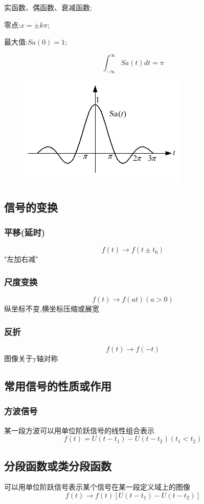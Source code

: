 \documentclass[12pt, a4paper, oneside]{ctexart}
\begin{document}
实函数、偶函数、衰减函数;

零点:$x=\pm k\pi$;

最大值:$Sa(0)=1$;

\[
    \int_{-\infty}^{\infty}Sa(t)dt=\pi
\]
\begin{figure}[H]
    \centering
    \includegraphics[width=8cm]{photos/抽样函数.jpg}
\end{figure}

\subsection{信号的变换}
\subsubsection{平移(延时)}
\[
    f(t) \to f(t\pm t_0)
\]
"左加右减"

\subsubsection{尺度变换}
\[
    f(t)\to f(at)(a>0)
\]
纵坐标不变,横坐标压缩或展宽

\subsubsection{反折}
\[
    f(t)\to f(-t)
\]
图像关于y轴对称

\subsection{常用信号的性质或作用}
\subsubsection{方波信号}
某一段方波可以用单位阶跃信号的线性组合表示
\[
    f(t) = U(t-t_1) - U(t-t_2)(t_1<t_2)
\]

\subsection{分段函数或类分段函数}
可以用单位阶跃信号表示某个信号在某一段定义域上的图像
\[
    f(t)\to f(t)[U(t-t_1) - U(t-t_2)]
\]
\end{document}
